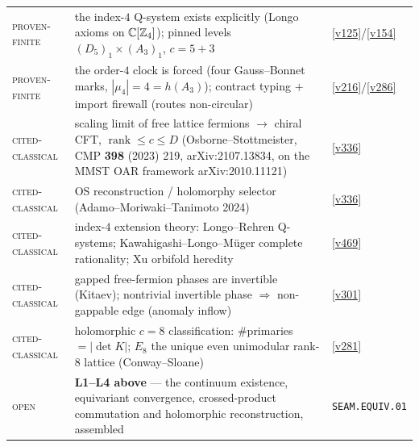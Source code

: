 \begin{center}
\begin{tabularx}{\linewidth}{@{}l>{\hsize=1.45\hsize\raggedright\arraybackslash}X>{\hsize=0.55\hsize\raggedright\arraybackslash}X@{}}
\textsc{proven-finite} & the index-$4$ Q-system exists explicitly (Longo axioms on $\mathbb C[\mathbb Z_4]$); pinned levels $(D_5)_1\times(A_3)_1$, $c=5+3$ & \vref{v125}/\vref{v154} \\
\textsc{proven-finite} & the order-$4$ clock is forced (four Gauss--Bonnet marks, $|\mu_4|=4=h(A_3)$); contract typing $+$ import firewall (routes non-circular) & \vref{v216}/\vref{v286} \\
\textsc{cited-classical} & scaling limit of free lattice fermions $\to$ chiral CFT, $\operatorname{rank}\le c\le D$ (Osborne--Stottmeister, CMP \textbf{398} (2023) 219, arXiv:2107.13834, on the MMST OAR framework arXiv:2010.11121) & \vref{v336} \\
\textsc{cited-classical} & OS reconstruction / holomorphy selector (Adamo--Moriwaki--Tanimoto 2024) & \vref{v336} \\
\textsc{cited-classical} & index-$4$ extension theory: Longo--Rehren Q-systems; Kawahigashi--Longo--M\"uger complete rationality; Xu orbifold heredity & \vref{v469} \\
\textsc{cited-classical} & gapped free-fermion phases are invertible (Kitaev); nontrivial invertible phase $\Rightarrow$ non-gappable edge (anomaly inflow) & \vref{v301} \\
\textsc{cited-classical} & holomorphic $c=8$ classification: $\#$primaries $=|\det K|$; $E_8$ the unique even unimodular rank-$8$ lattice (Conway--Sloane) & \vref{v281} \\
\textsc{open} & \textbf{L1--L4 above} --- the continuum existence, equivariant convergence, crossed-product commutation and holomorphic reconstruction, assembled & \texttt{SEAM.EQUIV.01} \\
\bottomrule
\end{tabularx}
\end{center}

